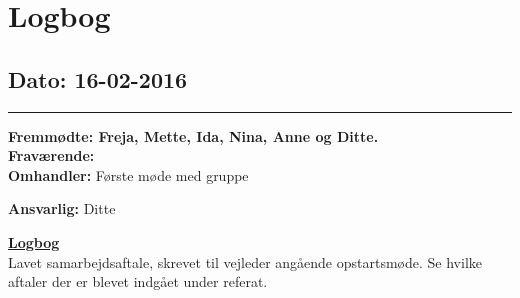 \chapter{Logbog}
\section{Dato: 16-02-2016}
\hrule
\textbf{Fremmødte: Freja, Mette, Ida, Nina, Anne og Ditte.} \\
\textbf{Fraværende: } \\
\textbf{Omhandler:} Første møde med gruppe

\textbf{Ansvarlig:} Ditte 

\underline{\textbf{Logbog}}\\
Lavet samarbejdsaftale, skrevet til vejleder angående opstartsmøde. Se hvilke aftaler der er blevet indgået under referat. 







